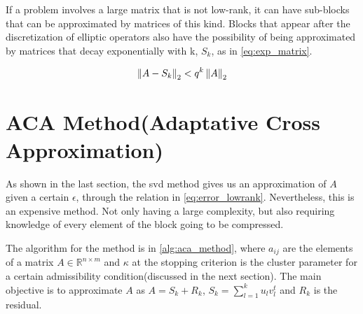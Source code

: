 If a problem involves a large matrix that is not low-rank, it can have sub-blocks that can be approximated by matrices of this kind. Blocks that appear after the discretization of elliptic operators also have the possibility of being approximated by matrices that decay exponentially with k, $S_{k}$, as in \ref{eq:exp_matrix}.

\begin{equation}\label{eq:exp_matrix}
    \left\lVert A-S_{k}\right\rVert_{2} < q^{k}\left\lVert A\right\rVert_{2}
\end{equation}




\section{ACA Method(Adaptative Cross Approximation)}

As shown in the last section, the \acrshort{svd} method gives us an approximation of $A$ given a certain $\epsilon$, through the relation in \ref{eq:error_lowrank}. Nevertheless, this is an expensive method. Not only having a large complexity, but also requiring knowledge of every element of the block going to be compressed.

The algorithm for the method is in \ref{alg:aca_method}, where $a_{ij}$ are the elements of a matrix $A \in \mathbb{R}^{n\times m}$ and $\kappa$ at the stopping criterion is the cluster parameter for a certain admissibility condition(discussed in the next section). The main objective is to approximate $A$ as $A=S_{k} + R_{k}$, $S_{k} = \sum_{l=1}^{k} u_{l}v_{l}^{t}$ and $R_{k}$ is the residual.



